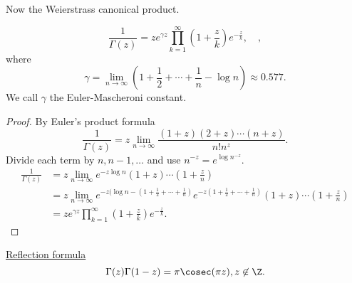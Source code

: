 \documentclass[a4paper]{article}
\begin{document}
Now the Weierstrass canonical product.
\begin{claim}
    \[
        \frac{1}{\Gamma(z)} = z e^{ \gamma z} \prod_{k  =1}^{\infty} \left( 1 + \frac{z}{k} \right) e^{ - \frac{z}{k}}, \quad     ,\]
        where
    \[
\gamma = \lim_{n \to \infty} \left(1 + \frac{1}{2} + \cdots + \frac{1}{n}  - \log n \right) \approx  0.577
    .\] 
    We call $\gamma$ the Euler-Mascheroni constant.
\end{claim}
\begin{proof}
By Euler's product formula
\[
\frac{1}{\Gamma(z)} = z \lim_{n \to \infty} \frac{( 1 + z) ( 2 + z) \cdots ( n  + z)}{ n! n^{z}}
.\] 
Divide each term by $n, n - 1, \ldots $ and use $n^{ - z} = e^{ \log n^{ - z}}$. 
\begin{align*}
     \frac{1}{\Gamma(z)} &= z \lim_{n \to \infty}e^{ - z \log n} (1 + z) \cdots ( 1  + \frac{z}{n})  \\
    &= z \lim_{n \to \infty} e^{ - z ( \log n -  ( 1 + \frac{1}{2} + \cdots + \frac{1}{n} )} e^{ - z ( 1 + \frac{1}{2} + \cdots + \frac{1}{n} )}( 1 + z) \cdots ( 1 + \frac{z}{n}) \\
    &=z e^{ \gamma z} \prod_{k = 1}^{\infty} ( 1 + \frac{z}{k}) e^{ -\frac{z}{k}}
.\end{align*}
\end{proof}
\underline{Reflection formula} \\
\[
    \Gamma(z) \Gamma ( 1 - z) = \pi \cosec  ( \pi z) , z \not \in \Z
.\] 
       
\end{document}
